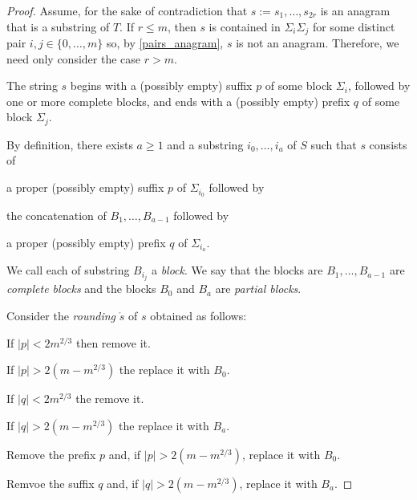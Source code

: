 \documentclass[kpfonts]{patmorin}
\begin{document}
\begin{proof}
    Assume, for the sake of contradiction that $s:=s_1,\ldots,s_{2r}$ is an anagram that is a substring of $T$. If $r \le m$, then $s$ is contained in $\Sigma_i\Sigma_j$ for some distinct pair $i,j\in\{0,\ldots,m\}$ so, by \cref{pairs_anagram}, $s$ is not an anagram.  Therefore, we need only consider the case $r> m$.

    The string $s$ begins with a (possibly empty) suffix $p$ of some block $\Sigma_i$, followed by one or more complete blocks, and ends with a (possibly empty) prefix $q$ of some block $\Sigma_j$.


    By definition, there exists $a\ge 1$ and a substring $i_0,\ldots,i_a$ of $S$ such that $s$ consists of
    \begin{inparaenum}[(i)]
        \item a proper (possibly empty) suffix $p$ of $\Sigma_{i_0}$ followed by
        \item the concatenation of $B_1,\ldots,B_{a-1}$ followed by
        \item a proper (possibly empty) prefix $q$ of $\Sigma_{i_a}$.
    \end{inparaenum}
    We call each of substring $B_{i_j}$ a \emph{block}.  We say that the blocks are $B_1,\ldots,B_{a-1}$ are \emph{complete blocks} and the blocks $B_0$ and $B_a$ are \emph{partial blocks}.





    Consider the \emph{rounding} $\mathring{s}$ of $s$ obtained as follows:
    \begin{compactenum}
        \item If $|p|<2m^{2/3}$ then remove it.
        \item If $|p|>2(m-m^{2/3})$ the replace it with $B_0$.
        \item If $|q|<2m^{2/3}$ the remove it.
        \item If $|q|>2(m-m^{2/3})$ the replace it with $B_a$.
    \end{compactenum}


        \item Remove the prefix $p$ and, if $|p|>2(m-m^{2/3})$, replace it with $B_0$.
        \item Remvoe the suffix $q$ and, if $|q|>2(m-m^{2/3})$, replace it with $B_a$.



\end{proof}
\end{document}
